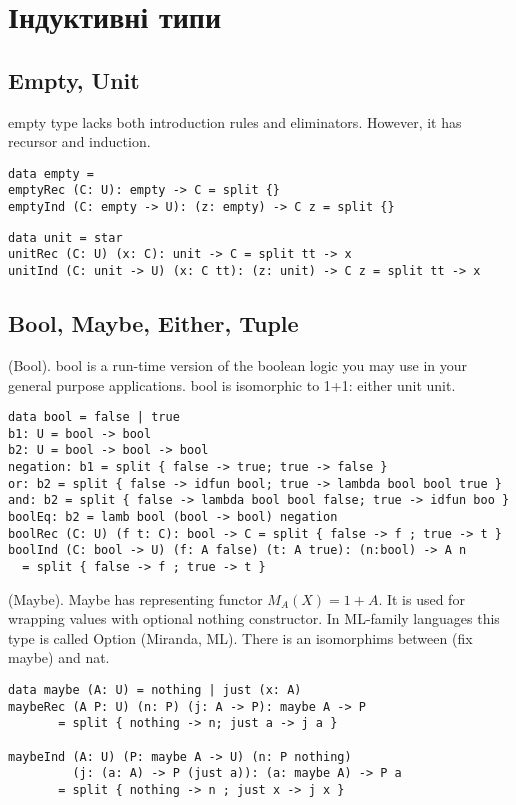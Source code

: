 \newpage
\section{Індуктивні типи}

\subsection{Empty, Unit}

empty type lacks both introduction rules and eliminators. However, it has recursor and induction.

\begin{lstlisting}
data empty =
emptyRec (C: U): empty -> C = split {}
emptyInd (C: empty -> U): (z: empty) -> C z = split {}
\end{lstlisting}

\begin{lstlisting}
data unit = star
unitRec (C: U) (x: C): unit -> C = split tt -> x
unitInd (C: unit -> U) (x: C tt): (z: unit) -> C z = split tt -> x
\end{lstlisting}

\newpage
\subsection{Bool, Maybe, Either, Tuple}

\begin{definition} (Bool).
bool is a run-time version of the boolean logic you may use
in your general purpose applications. bool is isomorphic
to 1+1: either unit unit.
\begin{lstlisting}
data bool = false | true
b1: U = bool -> bool
b2: U = bool -> bool -> bool
negation: b1 = split { false -> true; true -> false }
or: b2 = split { false -> idfun bool; true -> lambda bool bool true }
and: b2 = split { false -> lambda bool bool false; true -> idfun boo }
boolEq: b2 = lamb bool (bool -> bool) negation
boolRec (C: U) (f t: C): bool -> C = split { false -> f ; true -> t }
boolInd (C: bool -> U) (f: A false) (t: A true): (n:bool) -> A n
  = split { false -> f ; true -> t }
\end{lstlisting}
\end{definition}

\begin{definition} (Maybe).
Maybe has representing functor $M_A(X) = 1 + A$.
It is used for wrapping values with optional nothing constructor.
In ML-family languages this type is called Option (Miranda, ML).
There is an isomorphims between (fix maybe) and nat.
\begin{lstlisting}
data maybe (A: U) = nothing | just (x: A)
maybeRec (A P: U) (n: P) (j: A -> P): maybe A -> P
       = split { nothing -> n; just a -> j a }

maybeInd (A: U) (P: maybe A -> U) (n: P nothing)
         (j: (a: A) -> P (just a)): (a: maybe A) -> P a
       = split { nothing -> n ; just x -> j x }
\end{lstlisting}
\end{definition}

